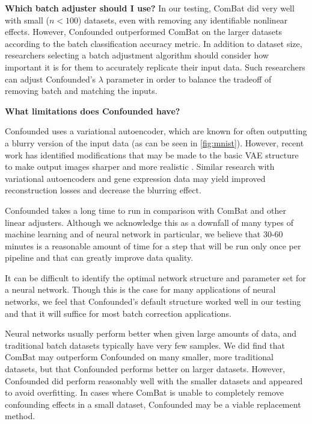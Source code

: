 \documentclass[12pt]{article}
\begin{document}
\textbf{Which batch adjuster should I use?}
In our testing, ComBat did very well with small ($n < 100$) datasets, even with removing any identifiable nonlinear effects.
However, Confounded outperformed ComBat on the larger datasets according to the batch classification accuracy metric.
In addition to dataset size, researchers selecting a batch adjustment algorithm should consider how important it is for them to accurately replicate their input data.
Such researchers can adjust Confounded's $\lambda$ parameter in order to balance the tradeoff of removing batch and matching the inputs.

\textbf{What limitations does Confounded have?}
\begin{enumerate*}[(a)]
	\item Confounded uses a variational autoencoder, which are known for often outputting a blurry version of the input data (as can be seen in \figurename{} \ref{fig:mnist}).
	However, recent work has identified modifications that may be made to the basic VAE structure to make output images sharper and more realistic \citep{hou_deep_2016}.
	Similar research with variational autoencoders and gene expression data may yield improved reconstruction losses and decrease the blurring effect.
	\item Confounded takes a long time to run in comparison with ComBat and other linear adjusters.
	Although we acknowledge this as a downfall of many types of machine learning and of neural network in particular, we believe that 30-60 minutes is a reasonable amount of time for a step that will be run only once per pipeline and that can greatly improve data quality.
	\item It can be difficult to identify the optimal network structure and parameter set for a neural network.
	Though this is the case for many applications of neural networks, we feel that Confounded's default structure worked well in our testing and that it will suffice for most batch correction applications.
	\item Neural networks usually perform better when given large amounts of data, and traditional batch datasets typically have very few samples.
	We did find that ComBat may outperform Confounded on many smaller, more traditional datasets, but that Confounded performs better on larger datasets.
	However, Confounded did perform reasonably well with the smaller datasets and appeared to avoid overfitting.
	In cases where ComBat is unable to completely remove confounding effects in a small dataset, Confounded may be a viable replacement method.
\end{enumerate*}
\end{document}
